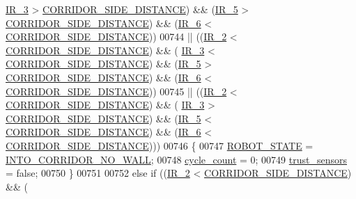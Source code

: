 \begin{DoxyCode}
      \hyperlink{state__machine_8c_a7831b71dc250258ecefe0e23f9920688}{IR\_3} > \hyperlink{state__machine_8c_a201d56046ddf552d57b4862e0ec07a10}{CORRIDOR\_SIDE\_DISTANCE}) && (\hyperlink{state__machine_8c_ad00ba6cc1cf461bda7059f5aafc06142}{IR\_5} > 
      \hyperlink{state__machine_8c_a201d56046ddf552d57b4862e0ec07a10}{CORRIDOR\_SIDE\_DISTANCE}) && (\hyperlink{state__machine_8c_a8c51bcd8b555e8c78fea79b88d28b55e}{IR\_6} < 
      \hyperlink{state__machine_8c_a201d56046ddf552d57b4862e0ec07a10}{CORRIDOR\_SIDE\_DISTANCE}))
00744              || ((\hyperlink{state__machine_8c_a07cfb2e201909d017a88a2a86c32cd4b}{IR\_2} < \hyperlink{state__machine_8c_a201d56046ddf552d57b4862e0ec07a10}{CORRIDOR\_SIDE\_DISTANCE}) && (
      \hyperlink{state__machine_8c_a7831b71dc250258ecefe0e23f9920688}{IR\_3} < \hyperlink{state__machine_8c_a201d56046ddf552d57b4862e0ec07a10}{CORRIDOR\_SIDE\_DISTANCE}) && (\hyperlink{state__machine_8c_ad00ba6cc1cf461bda7059f5aafc06142}{IR\_5} > 
      \hyperlink{state__machine_8c_a201d56046ddf552d57b4862e0ec07a10}{CORRIDOR\_SIDE\_DISTANCE}) && (\hyperlink{state__machine_8c_a8c51bcd8b555e8c78fea79b88d28b55e}{IR\_6} < 
      \hyperlink{state__machine_8c_a201d56046ddf552d57b4862e0ec07a10}{CORRIDOR\_SIDE\_DISTANCE}))
00745              || ((\hyperlink{state__machine_8c_a07cfb2e201909d017a88a2a86c32cd4b}{IR\_2} < \hyperlink{state__machine_8c_a201d56046ddf552d57b4862e0ec07a10}{CORRIDOR\_SIDE\_DISTANCE}) && (
      \hyperlink{state__machine_8c_a7831b71dc250258ecefe0e23f9920688}{IR\_3} > \hyperlink{state__machine_8c_a201d56046ddf552d57b4862e0ec07a10}{CORRIDOR\_SIDE\_DISTANCE}) && (\hyperlink{state__machine_8c_ad00ba6cc1cf461bda7059f5aafc06142}{IR\_5} < 
      \hyperlink{state__machine_8c_a201d56046ddf552d57b4862e0ec07a10}{CORRIDOR\_SIDE\_DISTANCE}) && (\hyperlink{state__machine_8c_a8c51bcd8b555e8c78fea79b88d28b55e}{IR\_6} < 
      \hyperlink{state__machine_8c_a201d56046ddf552d57b4862e0ec07a10}{CORRIDOR\_SIDE\_DISTANCE})))
00746             \{
00747                 \hyperlink{state__machine_8h_a5e5321a4a9085b83c8161454bf7a145c}{ROBOT\_STATE} = \hyperlink{state__machine_8h_a94b1da2e055fff4d143aa6aa891f79a9a99af48f69c66f114b652c80b043672da}{INTO\_CORRIDOR\_NO\_WALL};
00748                 \hyperlink{state__machine_8c_a937f74a65988b9e22241ab3765b82c50}{cycle\_count} = 0;
00749                 \hyperlink{state__machine_8h_ab10ef355c6ebe68985b8ee64030b0926}{trust\_sensors} = \textcolor{keyword}{false};
00750             \}
00751             
00752             \textcolor{keywordflow}{else} \textcolor{keywordflow}{if} ((\hyperlink{state__machine_8c_a07cfb2e201909d017a88a2a86c32cd4b}{IR\_2} < \hyperlink{state__machine_8c_a201d56046ddf552d57b4862e0ec07a10}{CORRIDOR\_SIDE\_DISTANCE}) && (

\end{DoxyCode}
